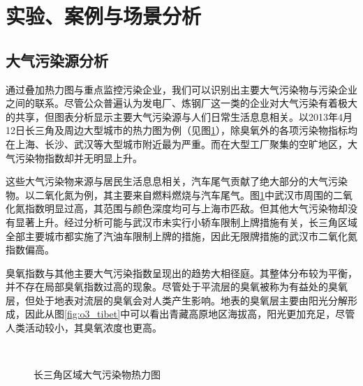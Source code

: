\documentclass[UTF8]{ctexrep}
\begin{document}
    \section{实验、案例与场景分析}

    \subsection{大气污染源分析}

    通过叠加热力图与重点监控污染企业，我们可以识别出主要大气污染物与污染企业之间的联系。尽管公众普遍认为发电厂、炼钢厂这一类的企业对大气污染有着极大的共享，但图表分析显示主要大气污染源与人们日常生活息息相关。以2013年4月12日长三角及周边大型城市的热力图为例（见图\ref{fig:source_city}），除臭氧外的各项污染物指标均在上海、长沙、武汉等大型城市附近最为严重。而在大型工厂聚集的空旷地区，大气污染物指数却并无明显上升。

    这些大气污染物来源与居民生活息息相关，汽车尾气贡献了绝大部分的大气污染物。以二氧化氮为例，其主要来自燃料燃烧与汽车尾气。图\ref{fig:source_city}中武汉市周围的二氧化氮指数明显过高，其范围与颜色深度均可与上海市匹敌。但其他大气污染物却没有显著上升。经过分析可能与武汉市未实行小轿车限制上牌措施有关，长三角区域全部主要城市都实施了汽油车限制上牌的措施，因此无限牌措施的武汉市二氧化氮指数偏高。

    臭氧指数与其他主要大气污染指数呈现出的趋势大相径庭。其整体分布较为平衡，并不存在局部臭氧指数过高的现象。尽管处于平流层的臭氧被称为有益处的臭氧层，但处于地表对流层的臭氧会对人类产生影响。地表的臭氧层主要由阳光分解形成，因此从图\ref{fig:o3_tibet}中可以看出青藏高原地区海拔高，阳光更加充足，尽管人类活动较小，其臭氧浓度也更高。


    \begin{figure}[h!]
        \centering
        \\
        \caption{长三角区域大气污染物热力图}
        \label{fig:source_city}
    \end{figure}
\end{document}
